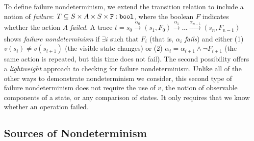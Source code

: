 To define failure nondeterminism, we extend the
transition relation to include a notion of \emph{failure}: $T \subseteq S
\times A \times S \times {\tt F: bool}$, where the boolean $F$ indicates
whether the action $A$ \emph{failed}.   A trace $t = s_0
\xrightarrow[]{\alpha_0} (s_1, F_0) \xrightarrow[]{\alpha_1} \ldots
\xrightarrow[]{\alpha_{n-1}} (s_n, F_{n-1})$ shows \emph{failure
  nondeterminism} if $\exists i$ such that $F_{i}$ (that is,
$\alpha_i$ \emph{fails}) and either (1) $v(s_{i}) \neq v(s_{i+1})$
(the visible state changes) or (2)
$\alpha_i = \alpha_{i+1} \wedge \neg F_{i+1}$ (the same action is
repeated, but this time does not fail).  The second possibility
offers a \emph{lightweight} approach to checking for failure
nondeterminism.  Unlike all of the other ways to demonstrate
nondeterminism we consider, this second type of failure nondeterminism does not
require the use of $v$, the notion of observable components of
a state, or any comparison of states.  It only
requires that we know whether an operation failed.

\subsection{Sources of Nondeterminism}
\label{sec:sources}

